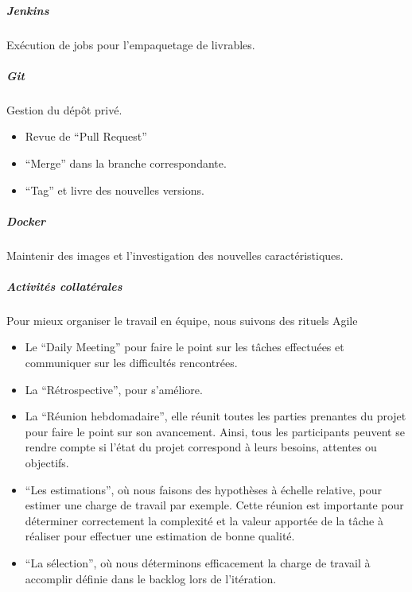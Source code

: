 \subparagraph{Jenkins} Exécution de jobs pour l'empaquetage de livrables.

\subparagraph{Git} Gestion du dépôt privé.
\begin{itemize}
  \item Revue de \enquote{Pull Request}
  \item \enquote{Merge} dans la branche correspondante.
  \item \enquote{Tag} et livre des nouvelles versions.
\end{itemize}

\subparagraph{Docker} Maintenir des images et l'investigation des nouvelles caractéristiques.

\subparagraph{Activités collatérales} Pour mieux organiser le travail en équipe, nous suivons des rituels Agile
\begin{itemize}
  \item Le \enquote{Daily Meeting} pour faire le point sur les tâches effectuées et communiquer sur les difficultés rencontrées.
  \item La \enquote{Rétrospective}, pour s’améliore.
  \item La \enquote{Réunion hebdomadaire},  elle réunit toutes les parties prenantes du projet pour faire le point sur son avancement. Ainsi, tous les participants peuvent se rendre compte si l’état du projet correspond à leurs besoins, attentes ou objectifs.
  \item \enquote{Les estimations}, où nous faisons des hypothèses à échelle relative, pour estimer une charge de travail par exemple. Cette réunion est importante pour déterminer correctement la complexité et la valeur apportée de la tâche à réaliser pour effectuer une estimation de bonne qualité.
  \item \enquote{La sélection}, où nous déterminons efficacement la charge de travail à accomplir définie dans le backlog lors de l'itération.
\end{itemize}

